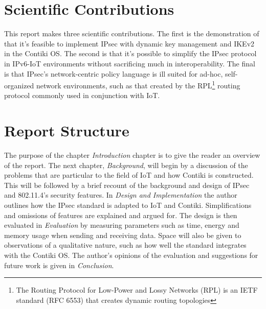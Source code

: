 \documentclass[final,letterpaper,twoside,12pt,twocolumn]{report}
\begin{document}

	

\section{Scientific Contributions}
This report makes three scientific contributions. The first is the demonstration of that it's feasible to implement IPsec with dynamic key management and IKEv2 in the Contiki OS. The second is that it's possible to simplify the IPsec protocol in IPv6-IoT environments without sacrificing much in interoperability. The final is that IPsec's network-centric policy language is ill suited for ad-hoc, self-organized network environments, such as that created by the RPL\footnote{The Routing Protocol for Low-Power and Lossy Networks (RPL) is an IETF standard (RFC 6553) that creates dynamic routing topologies} routing protocol commonly used in conjunction with IoT.

\section{Report Structure}
The purpose of the chapter \emph{Introduction} chapter is to give the reader an overview of the report. The next chapter, \emph{Background}, will begin by a discussion of the problems that are particular to the field of IoT and how Contiki is constructed. This will be followed by a brief recount of the background and design of IPsec and 802.11.4's security features. In \emph{Design and Implementation} the author outlines how the IPsec standard is adapted to IoT and Contiki. Simplifications and omissions of features are explained and argued for. The design is then evaluated in \emph{Evaluation} by measuring parameters such as time, energy and memory usage when sending and receiving data. Space will also be given to observations of a qualitative nature, such as how well the standard integrates with the Contiki OS. The author's opinions of the evaluation and suggestions for future work is given in \emph{Conclusion}.
\end{document}
